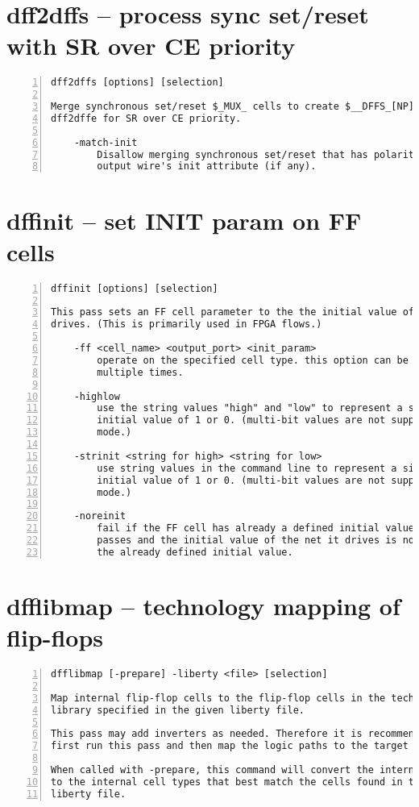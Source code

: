 \section{dff2dffs -- process sync set/reset with SR over CE priority}
\label{cmd:dff2dffs}
\begin{lstlisting}[numbers=left,frame=single]
    dff2dffs [options] [selection]

Merge synchronous set/reset $_MUX_ cells to create $__DFFS_[NP][NP][01], to be run before
dff2dffe for SR over CE priority.

    -match-init
        Disallow merging synchronous set/reset that has polarity opposite of the
        output wire's init attribute (if any).
\end{lstlisting}

\section{dffinit -- set INIT param on FF cells}
\label{cmd:dffinit}
\begin{lstlisting}[numbers=left,frame=single]
    dffinit [options] [selection]

This pass sets an FF cell parameter to the the initial value of the net it
drives. (This is primarily used in FPGA flows.)

    -ff <cell_name> <output_port> <init_param>
        operate on the specified cell type. this option can be used
        multiple times.

    -highlow
        use the string values "high" and "low" to represent a single-bit
        initial value of 1 or 0. (multi-bit values are not supported in this
        mode.)

    -strinit <string for high> <string for low> 
        use string values in the command line to represent a single-bit
        initial value of 1 or 0. (multi-bit values are not supported in this
        mode.)

    -noreinit
        fail if the FF cell has already a defined initial value set in other
        passes and the initial value of the net it drives is not equal to
        the already defined initial value.
\end{lstlisting}

\section{dfflibmap -- technology mapping of flip-flops}
\label{cmd:dfflibmap}
\begin{lstlisting}[numbers=left,frame=single]
    dfflibmap [-prepare] -liberty <file> [selection]

Map internal flip-flop cells to the flip-flop cells in the technology
library specified in the given liberty file.

This pass may add inverters as needed. Therefore it is recommended to
first run this pass and then map the logic paths to the target technology.

When called with -prepare, this command will convert the internal FF cells
to the internal cell types that best match the cells found in the given
liberty file.
\end{lstlisting}

